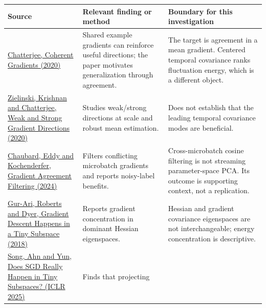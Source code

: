 \documentclass[
  british,
  10pt,
  a4paper,
]{article}
\newcounter{none} %
\begin{document}
{\def\LTcaptype{none} %
\begin{longtable}[]{@{}
  >{\raggedright\arraybackslash}p{}
  >{\raggedright\arraybackslash}p{}
  >{\raggedright\arraybackslash}p{}@{}}
\toprule\noalign{}
\begin{minipage}[b]{\linewidth}\raggedright
Source
\end{minipage} & \begin{minipage}[b]{\linewidth}\raggedright
Relevant finding or method
\end{minipage} & \begin{minipage}[b]{\linewidth}\raggedright
Boundary for this investigation
\end{minipage} \\
\midrule\noalign{}
\endhead
\bottomrule\noalign{}
\endlastfoot
\href{https://arxiv.org/abs/2002.10657}{Chatterjee,\allowbreak{}
Coherent Gradients (2020)} & Shared example gradients can reinforce
useful directions; the paper motivates generalization through agreement.
& The target is agreement in a mean gradient. Centered temporal
covariance ranks fluctuation energy, which is a different object. \\
\href{https://arxiv.org/abs/2003.07422}{Zielinski, Krishnan and
Chatterjee,\allowbreak{} Weak and Strong Gradient Directions (2020)} &
Studies weak/\allowbreak{}strong directions at scale and robust mean
estimation.\allowbreak{} & Does not establish that the leading temporal
covariance modes are beneficial.\allowbreak{} \\
\href{https://arxiv.org/abs/2412.18052}{Chaubard, Eddy and
Kochenderfer\allowbreak{},\allowbreak{} Gradient Agreement Filtering
(2024)} & Filters conflicting microbatch gradients and reports
noisy-\allowbreak{}label benefits. & Cross-\allowbreak{}microbatch
cosine filtering is not streaming parameter-\allowbreak{}space PCA. Its
outcome is supporting context, not a replication.\allowbreak{} \\
\href{https://arxiv.org/abs/1812.04754}{Gur-Ari, Roberts and Dyer,
Gradient Descent Happens in a Tiny Subspace (2018)} & Reports gradient
concentration in dominant Hessian eigenspaces.\allowbreak{} & Hessian
and gradient covariance eigenspaces are not interchangeable; energy
concentration is descriptive.\allowbreak{} \\
\href{https://arxiv.org/abs/2405.16002}{Song, Ahn and Yun, Does SGD
Really Happen in Tiny Subspaces? (ICLR 2025)} & Finds that projecting

\end{longtable}}
\end{document}
